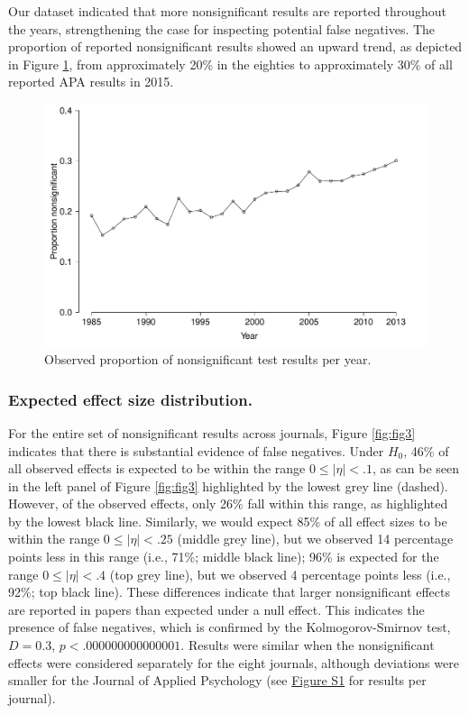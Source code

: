 \documentclass{article}
\begin{document}
Our dataset indicated that more nonsignificant results are reported throughout the years, strengthening the case for inspecting potential false negatives. The proportion of reported nonsignificant results showed an upward trend, as depicted in Figure \ref{fig:fig2}, from approximately 20\% in the eighties to approximately 30\% of all reported APA results in 2015.

\begin{figure}
\begin{center}
\includegraphics{../figures/Fig2.pdf}
\end{center}
\caption{Observed proportion of nonsignificant test results per year.}
\label{fig:fig2}
\end{figure}

\subsubsection*{Expected effect size distribution.}


For the entire set of nonsignificant results across journals, Figure \ref{fig:fig3} indicates that there is substantial evidence of false negatives. Under $H_0$, 46\% of all observed effects is expected to be within the range $0\leq|\eta|<.1$, as can be seen in the left panel of Figure \ref{fig:fig3} highlighted by the lowest grey line (dashed). However, of the observed effects, only 26\% fall within this range, as highlighted by the lowest black line. Similarly, we would expect 85\% of all effect sizes to be within the range $0\leq|\eta|<.25$ (middle grey line), but we observed 14 percentage points less in this range (i.e., 71\%; middle black line); 96\% is expected for the range $0\leq|\eta|<.4$ (top grey line), but we observed 4 percentage points less (i.e., 92\%; top black line). These differences indicate that larger nonsignificant effects are reported in papers than expected under a null effect. This indicates the presence of false negatives, which is confirmed by the Kolmogorov-Smirnov test, $D=0.3$, $p<.000000000000001$. Results were similar when the nonsignificant effects were considered separately for the eight journals, although deviations were smaller for the Journal of Applied Psychology (see \href{../figures/S1Fig}{Figure S1} for results per journal).
\end{document}
